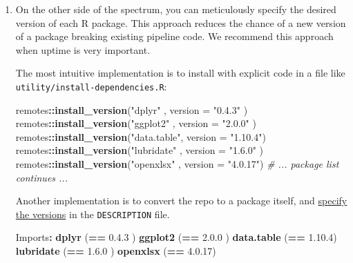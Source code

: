 \documentclass[
]{book}
\newenvironment{Shaded}{\begin{snugshade}}{\end{snugshade}}
\newcommand{\CommentTok}[1]{\textcolor[rgb]{0.56,0.35,0.01}{\textit{#1}}}
\newcommand{\DataTypeTok}[1]{\textcolor[rgb]{0.13,0.29,0.53}{#1}}
\newcommand{\DecValTok}[1]{\textcolor[rgb]{0.00,0.00,0.81}{#1}}
\newcommand{\FloatTok}[1]{\textcolor[rgb]{0.00,0.00,0.81}{#1}}
\newcommand{\KeywordTok}[1]{\textcolor[rgb]{0.13,0.29,0.53}{\textbf{#1}}}
\newcommand{\NormalTok}[1]{#1}
\newcommand{\OperatorTok}[1]{\textcolor[rgb]{0.81,0.36,0.00}{\textbf{#1}}}
\newcommand{\StringTok}[1]{\textcolor[rgb]{0.31,0.60,0.02}{#1}}
\begin{document}
\begin{enumerate}
\def\labelenumi{\arabic{enumi}.}
\item
  On the other side of the spectrum, you can meticulously specify the desired version of each R package. This approach reduces the chance of a new version of a package breaking existing pipeline code. We recommend this approach when uptime is very important.

  The most intuitive implementation is to install with explicit code in a file like \texttt{utility/install-dependencies.R}:

\begin{Shaded}
\begin{Highlighting}[]
\NormalTok{remotes}\OperatorTok{::}\KeywordTok{install\_version}\NormalTok{(}\StringTok{"dplyr"}\NormalTok{     , }\DataTypeTok{version =} \StringTok{"0.4.3"}\NormalTok{ )}
\NormalTok{remotes}\OperatorTok{::}\KeywordTok{install\_version}\NormalTok{(}\StringTok{"ggplot2"}\NormalTok{   , }\DataTypeTok{version =} \StringTok{"2.0.0"}\NormalTok{ )}
\NormalTok{remotes}\OperatorTok{::}\KeywordTok{install\_version}\NormalTok{(}\StringTok{"data.table"}\NormalTok{, }\DataTypeTok{version =} \StringTok{"1.10.4"}\NormalTok{)}
\NormalTok{remotes}\OperatorTok{::}\KeywordTok{install\_version}\NormalTok{(}\StringTok{"lubridate"}\NormalTok{ , }\DataTypeTok{version =} \StringTok{"1.6.0"}\NormalTok{ )}
\NormalTok{remotes}\OperatorTok{::}\KeywordTok{install\_version}\NormalTok{(}\StringTok{"openxlsx"}\NormalTok{  , }\DataTypeTok{version =} \StringTok{"4.0.17"}\NormalTok{)}
\CommentTok{\# ... package list continues ...}
\end{Highlighting}
\end{Shaded}

  Another implementation is to convert the repo to a package itself, and \href{http://r-pkgs.had.co.nz/description.html\#dependencies}{specify the versions} in the \texttt{DESCRIPTION} file.

\begin{Shaded}
\begin{Highlighting}[]
\NormalTok{Imports}\OperatorTok{:}
\StringTok{   }\KeywordTok{dplyr}\NormalTok{       (}\OperatorTok{==}\StringTok{ }\DecValTok{0}\NormalTok{.}\FloatTok{4.3}\NormalTok{ )}
   \KeywordTok{ggplot2}\NormalTok{     (}\OperatorTok{==}\StringTok{ }\DecValTok{2}\NormalTok{.}\FloatTok{0.0}\NormalTok{ )}
   \KeywordTok{data.table}\NormalTok{  (}\OperatorTok{==}\StringTok{ }\DecValTok{1}\NormalTok{.}\FloatTok{10.4}\NormalTok{)}
   \KeywordTok{lubridate}\NormalTok{   (}\OperatorTok{==}\StringTok{ }\DecValTok{1}\NormalTok{.}\FloatTok{6.0}\NormalTok{ )}
   \KeywordTok{openxlsx}\NormalTok{    (}\OperatorTok{==}\StringTok{ }\DecValTok{4}\NormalTok{.}\FloatTok{0.17}\NormalTok{)}
\end{Highlighting}
\end{Shaded}


\end{enumerate}
\end{document}
